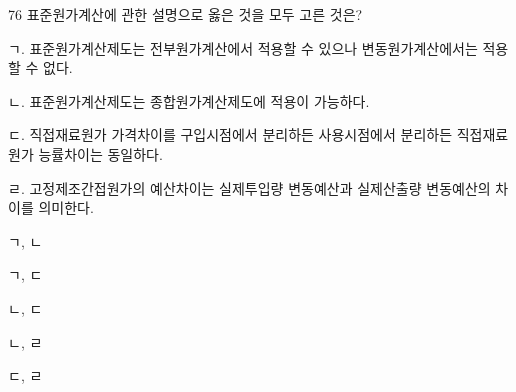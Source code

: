 \begin{question}{76}
표준원가계산에 관한 설명으로 옳은 것을 모두 고른 것은?
\begin{framedtext}
ㄱ. 표준원가계산제도는 전부원가계산에서 적용할 수 있으나 변동원가계산에서는 적용할 수 없다. \par
ㄴ. 표준원가계산제도는 종합원가계산제도에 적용이 가능하다. \par
ㄷ. 직접재료원가 가격차이를 구입시점에서 분리하든 사용시점에서 분리하든 직접재료원가 능률차이는 동일하다. \par
ㄹ. 고정제조간접원가의 예산차이는 실제투입량 변동예산과 실제산출량 변동예산의 차이를 의미한다. \par
\end{framedtext}
\begin{choices}
  \item ㄱ, ㄴ
  \item ㄱ, ㄷ
  \item ㄴ, ㄷ
  \item ㄴ, ㄹ
  \item ㄷ, ㄹ
\end{choices}
\end{question}
